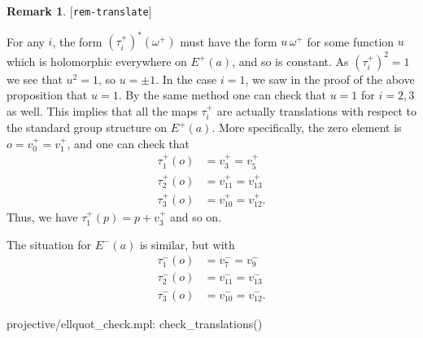 \documentclass[reqno]{amsart}
\newcommand{\lbl}[1]{\label{#1}\textup{[\texttt{#1}]}\par}
\newcommand{\lbl}{\label}
\newcommand{\om}        {\omega}
\renewcommand{\:}{\colon}
\theoremstyle{definition}
\newtheorem{remark}[theorem]{Remark}
\begin{document}
\begin{remark}\lbl{rem-translate}
 For any $i$, the form $(\tau^+_i)^*(\om^+)$ must have the form
 $u\,\om^+$ for some function $u$ which is holomorphic everywhere on
 $E^+(a)$, and so is constant.  As $(\tau^+_i)^2=1$ we see that
 $u^2=1$, so $u=\pm 1$.  In the case $i=1$, we saw in the proof of the
 above proposition that $u=1$.  By the same method one can check that
 $u=1$ for $i=2,3$ as well.  This implies that all the maps $\tau^+_i$
 are actually translations with respect to the standard group
 structure on $E^+(a)$.  More specifically, the zero element is
 $o=v^+_0=v^+_1$, and one can check that
 \begin{align*}
  \tau^+_1(o) &= v^+_3 = v^+_5 \\
  \tau^+_2(o) &= v^+_{11} = v^+_{13} \\
  \tau^+_3(o) &= v^+_{10} = v^+_{12}.
 \end{align*}
 Thus, we have $\tau^+_1(p)=p+v^+_3$ and so on.

 The situation for $E^-(a)$ is similar, but with
 \begin{align*}
  \tau^-_1(o) &= v^-_7 = v^-_9 \\
  \tau^-_2(o) &= v^-_{11} = v^-_{13} \\
  \tau^-_3(o) &= v^-_{10} = v^-_{12}.
 \end{align*}
 \begin{checks}
  projective/ellquot_check.mpl: check_translations()
 \end{checks}
\end{remark}
\end{document}
